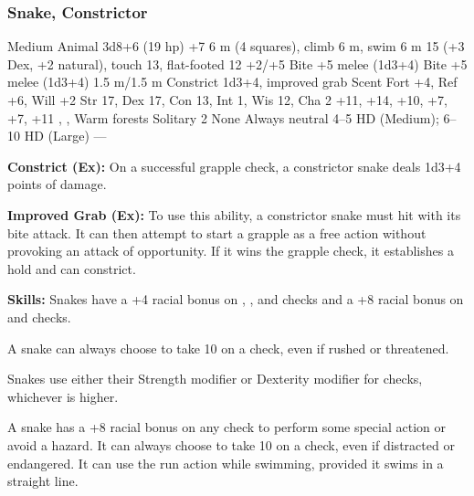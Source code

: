 \subsubsection{Snake, Constrictor}
\begin{MonsterStats}
{Medium Animal}
{3d8+6 (19 hp)}
{+7}
{6 m (4 squares), climb 6 m, swim 6 m}
{15 (+3 Dex, +2 natural), touch 13, flat-footed 12}
{+2/+5}
{Bite +5 melee (1d3+4)}
{Bite +5 melee (1d3+4)}
{1.5 m/1.5 m}
{Constrict 1d3+4, improved grab}
{Scent}
{Fort +4, Ref +6, Will +2}
{Str 17, Dex 17, Con 13, Int 1, Wis 12, Cha 2}
{ +11,  +14,  +10,  +7,  +7,  +11}
{, , }
{Warm forests}
{Solitary}
{2}
{None}
{Always neutral}
{4--5 HD (Medium); 6--10 HD (Large)}
{---}
\end{MonsterStats}

\textbf{Constrict (Ex):} On a successful grapple check, a constrictor snake deals 1d3+4 points of damage.

\textbf{Improved Grab (Ex):} To use this ability, a constrictor snake must hit with its bite attack. It can then attempt to start a grapple as a free action without provoking an attack of opportunity. If it wins the grapple check, it establishes a hold and can constrict.

\textbf{Skills:} Snakes have a +4 racial bonus on , , and  checks and a +8 racial bonus on  and  checks.

A snake can always choose to take 10 on a  check, even if rushed or threatened.

Snakes use either their Strength modifier or Dexterity modifier for  checks, whichever is higher.

A snake has a +8 racial bonus on any  check to perform some special action or avoid a hazard. It can always choose to take 10 on a  check, even if distracted or endangered. It can use the run action while swimming, provided it swims in a straight line.
